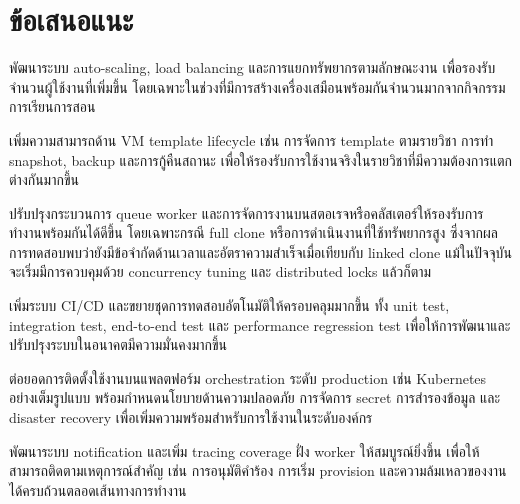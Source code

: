 \section{ข้อเสนอแนะ}
\begin{mycustomenum}[label=5.4.\arabic*] 
    \item พัฒนาระบบ auto-scaling, load balancing และการแยกทรัพยากรตามลักษณะงาน เพื่อรองรับจำนวนผู้ใช้งานที่เพิ่มขึ้น โดยเฉพาะในช่วงที่มีการสร้างเครื่องเสมือนพร้อมกันจำนวนมากจากกิจกรรมการเรียนการสอน
    \item เพิ่มความสามารถด้าน VM template lifecycle เช่น การจัดการ template ตามรายวิชา การทำ snapshot, backup และการกู้คืนสถานะ เพื่อให้รองรับการใช้งานจริงในรายวิชาที่มีความต้องการแตกต่างกันมากขึ้น
    \item ปรับปรุงกระบวนการ queue worker และการจัดการงานบนสตอเรจหรือคลัสเตอร์ให้รองรับการทำงานพร้อมกันได้ดีขึ้น โดยเฉพาะกรณี full clone หรือการดำเนินงานที่ใช้ทรัพยากรสูง ซึ่งจากผลการทดสอบพบว่ายังมีข้อจำกัดด้านเวลาและอัตราความสำเร็จเมื่อเทียบกับ linked clone แม้ในปัจจุบันจะเริ่มมีการควบคุมด้วย concurrency tuning และ distributed locks แล้วก็ตาม
    \item เพิ่มระบบ CI/CD และขยายชุดการทดสอบอัตโนมัติให้ครอบคลุมมากขึ้น ทั้ง unit test, integration test, end-to-end test และ performance regression test เพื่อให้การพัฒนาและปรับปรุงระบบในอนาคตมีความมั่นคงมากขึ้น
    \item ต่อยอดการติดตั้งใช้งานบนแพลตฟอร์ม orchestration ระดับ production เช่น Kubernetes อย่างเต็มรูปแบบ พร้อมกำหนดนโยบายด้านความปลอดภัย การจัดการ secret การสำรองข้อมูล และ disaster recovery เพื่อเพิ่มความพร้อมสำหรับการใช้งานในระดับองค์กร
    \item พัฒนาระบบ notification และเพิ่ม tracing coverage ฝั่ง worker ให้สมบูรณ์ยิ่งขึ้น เพื่อให้สามารถติดตามเหตุการณ์สำคัญ เช่น การอนุมัติคำร้อง การเริ่ม provision และความล้มเหลวของงานได้ครบถ้วนตลอดเส้นทางการทำงาน
\end{mycustomenum}
